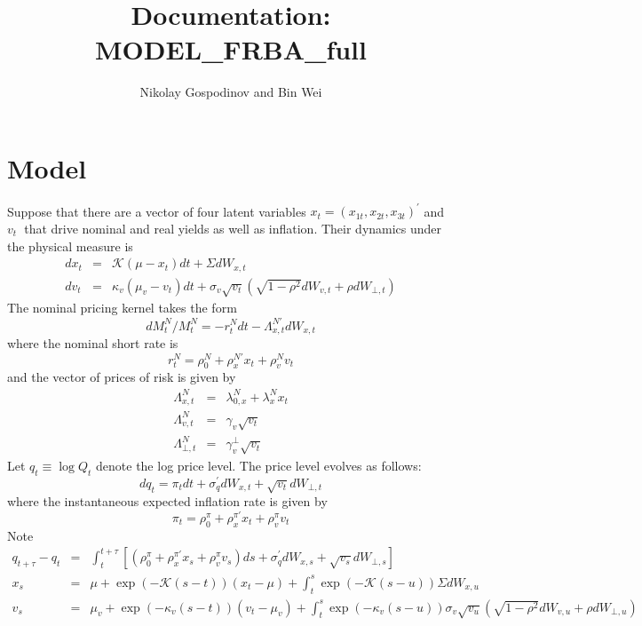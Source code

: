 \documentclass{article}
\begin{document}
\title{Documentation: MODEL\_FRBA\_full}
\author{Nikolay Gospodinov and Bin Wei}
\maketitle

\section{Model}

Suppose that there are a vector of four latent variables $x_{t}=\left(
x_{1t},x_{2t},x_{3t}\right) ^{\prime }$ and $v_{t}$\textbf{\ }that drive
nominal and real yields as well as inflation. Their dynamics under the
physical measure is%
\begin{eqnarray}
dx_{t} &=&\mathcal{K}\left( \mu -x_{t}\right) dt+\Sigma dW_{x,t} \\
dv_{t} &=&\kappa _{v}\left( \mu _{v}-v_{t}\right) dt+\sigma _{v}\sqrt{v_{t}}%
\left( \sqrt{1-\rho ^{2}}dW_{v,t}+\rho dW_{\bot ,t}\right)
\end{eqnarray}%
The nominal pricing kernel takes the form%
\begin{equation}
dM_{t}^{N}/M_{t}^{N}=-r_{t}^{N}dt-\Lambda _{x,t}^{N\prime }dW_{x,t}
\end{equation}%
where the nominal short rate is%
\begin{equation}
r_{t}^{N}=\rho _{0}^{N}+\rho _{x}^{N\prime }x_{t}+\rho _{v}^{N}v_{t}
\end{equation}%
and the vector of prices of risk is given by\qquad 
\begin{eqnarray*}
\Lambda _{x,t}^{N} &=&\lambda _{0,x}^{N}+\lambda _{x}^{N}x_{t} \\
\Lambda _{v,t}^{N} &=&\gamma _{v}\sqrt{v_{t}} \\
\Lambda _{\bot ,t}^{N} &=&\gamma _{v}^{\bot }\sqrt{v_{t}}
\end{eqnarray*}%
Let $q_{t}\equiv \log Q_{t}$ denote the log price level. The price level
evolves as follows: 
\begin{equation}
dq_{t}=\pi _{t}dt+\sigma _{q}^{\prime }dW_{x,t}+\sqrt{v_{t}}dW_{\bot ,t}
\end{equation}%
where the instantaneous expected inflation rate is given by 
\begin{equation}
\pi _{t}=\rho _{0}^{\pi }+\rho _{x}^{\pi \prime }x_{t}+\rho _{v}^{\pi }v_{t}
\end{equation}%
Note 
\begin{eqnarray*}
q_{t+\tau }-q_{t} &=&\int_{t}^{t+\tau }\left[ \left( \rho _{0}^{\pi }+\rho
_{x}^{\pi \prime }x_{s}+\rho _{v}^{\pi }v_{s}\right) ds+\sigma _{q}^{\prime
}dW_{x,s}+\sqrt{v_{s}}dW_{\bot ,s}\right] \\
x_{s} &=&\mu +\exp \left( -\mathcal{K}\left( s-t\right) \right) \left(
x_{t}-\mu \right) +\int_{t}^{s}\exp \left( -\mathcal{K}\left( s-u\right)
\right) \Sigma dW_{x,u} \\
v_{s} &=&\mu _{v}+\exp \left( -\kappa _{v}\left( s-t\right) \right) \left(
v_{t}-\mu _{v}\right) +\int_{t}^{s}\exp \left( -\kappa _{v}\left( s-u\right)
\right) \sigma _{v}\sqrt{v_{u}}\left( \sqrt{1-\rho ^{2}}dW_{v,u}+\rho
dW_{\bot ,u}\right)
\end{eqnarray*}%
\end{document}
